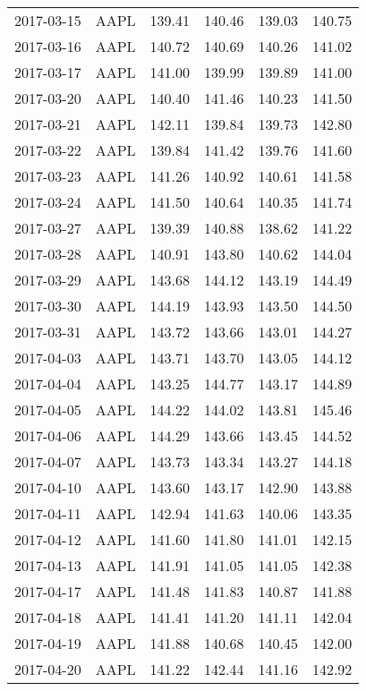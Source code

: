 \documentclass[a4paper, 12pt]{report}
\begin{document}
\begin{appendices}
\begin{longtable}{llllll}
  2017-03-15 & AAPL & 139.41 & 140.46 & 139.03 & 140.75 \\ 
  2017-03-16 & AAPL & 140.72 & 140.69 & 140.26 & 141.02 \\ 
  2017-03-17 & AAPL & 141.00 & 139.99 & 139.89 & 141.00 \\ 
  2017-03-20 & AAPL & 140.40 & 141.46 & 140.23 & 141.50 \\ 
  2017-03-21 & AAPL & 142.11 & 139.84 & 139.73 & 142.80 \\ 
  2017-03-22 & AAPL & 139.84 & 141.42 & 139.76 & 141.60 \\ 
  2017-03-23 & AAPL & 141.26 & 140.92 & 140.61 & 141.58 \\ 
  2017-03-24 & AAPL & 141.50 & 140.64 & 140.35 & 141.74 \\ 
  2017-03-27 & AAPL & 139.39 & 140.88 & 138.62 & 141.22 \\ 
  2017-03-28 & AAPL & 140.91 & 143.80 & 140.62 & 144.04 \\ 
  2017-03-29 & AAPL & 143.68 & 144.12 & 143.19 & 144.49 \\ 
  2017-03-30 & AAPL & 144.19 & 143.93 & 143.50 & 144.50 \\ 
  2017-03-31 & AAPL & 143.72 & 143.66 & 143.01 & 144.27 \\ 
  2017-04-03 & AAPL & 143.71 & 143.70 & 143.05 & 144.12 \\ 
  2017-04-04 & AAPL & 143.25 & 144.77 & 143.17 & 144.89 \\ 
  2017-04-05 & AAPL & 144.22 & 144.02 & 143.81 & 145.46 \\ 
  2017-04-06 & AAPL & 144.29 & 143.66 & 143.45 & 144.52 \\ 
  2017-04-07 & AAPL & 143.73 & 143.34 & 143.27 & 144.18 \\ 
  2017-04-10 & AAPL & 143.60 & 143.17 & 142.90 & 143.88 \\ 
  2017-04-11 & AAPL & 142.94 & 141.63 & 140.06 & 143.35 \\ 
  2017-04-12 & AAPL & 141.60 & 141.80 & 141.01 & 142.15 \\ 
  2017-04-13 & AAPL & 141.91 & 141.05 & 141.05 & 142.38 \\ 
  2017-04-17 & AAPL & 141.48 & 141.83 & 140.87 & 141.88 \\ 
  2017-04-18 & AAPL & 141.41 & 141.20 & 141.11 & 142.04 \\ 
  2017-04-19 & AAPL & 141.88 & 140.68 & 140.45 & 142.00 \\ 
  2017-04-20 & AAPL & 141.22 & 142.44 & 141.16 & 142.92 \\ 

\end{longtable}
\end{appendices}
\end{document}

